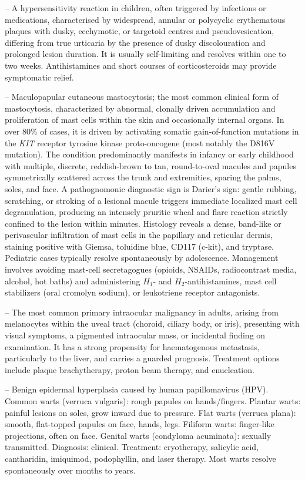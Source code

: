 -- A hypersensitivity reaction in children, often triggered by infections or medications, characterised by widespread, annular or polycyclic erythematous plaques with dusky, ecchymotic, or targetoid centres and pseudovesication, differing from true urticaria by the presence of dusky discolouration and prolonged lesion duration. It is usually self-limiting and resolves within one to two weeks. Antihistamines and short courses of corticosteroids may provide symptomatic relief.

-- Maculopapular cutaneous mastocytosis; the most common clinical form of mastocytosis, characterized by abnormal, clonally driven accumulation and proliferation of mast cells within the skin and occasionally internal organs. In over $80\%$ of cases, it is driven by activating somatic gain-of-function mutations in the \textit{KIT} receptor tyrosine kinase proto-oncogene (most notably the D816V mutation). The condition predominantly manifests in infancy or early childhood with multiple, discrete, reddish-brown to tan, round-to-oval macules and papules symmetrically scattered across the trunk and extremities, sparing the palms, soles, and face. A pathognomonic diagnostic sign is Darier's sign: gentle rubbing, scratching, or stroking of a lesional macule triggers immediate localized mast cell degranulation, producing an intensely pruritic wheal and flare reaction strictly confined to the lesion within minutes. Histology reveals a dense, band-like or perivascular infiltration of mast cells in the papillary and reticular dermis, staining positive with Giemsa, toluidine blue, CD117 (c-kit), and tryptase. Pediatric cases typically resolve spontaneously by adolescence. Management involves avoiding mast-cell secretagogues (opioids, NSAIDs, radiocontrast media, alcohol, hot baths) and administering $H_1$- and $H_2$-antihistamines, mast cell stabilizers (oral cromolyn sodium), or leukotriene receptor antagonists.

-- The most common primary intraocular malignancy in adults, arising from melanocytes within the uveal tract (choroid, ciliary body, or iris), presenting with visual symptoms, a pigmented intraocular mass, or incidental finding on examination. It has a strong propensity for haematogenous metastasis, particularly to the liver, and carries a guarded prognosis. Treatment options include plaque brachytherapy, proton beam therapy, and enucleation.

-- Benign epidermal hyperplasia caused by human papillomavirus (HPV). Common warts (verruca vulgaris): rough papules on hands/fingers. Plantar warts: painful lesions on soles, grow inward due to pressure. Flat warts (verruca plana): smooth, flat-topped papules on face, hands, legs. Filiform warts: finger-like projections, often on face. Genital warts (condyloma acuminata): sexually transmitted. Diagnosis: clinical. Treatment: cryotherapy, salicylic acid, cantharidin, imiquimod, podophyllin, and laser therapy. Most warts resolve spontaneously over months to years.

